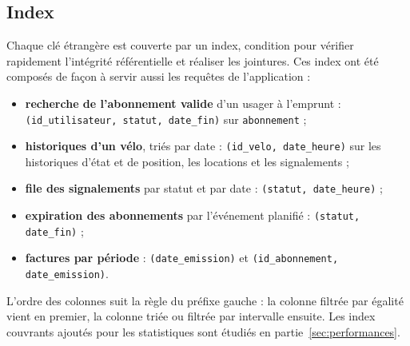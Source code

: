 \subsection{Index}

Chaque clé étrangère est couverte par un index, condition pour vérifier rapidement l'intégrité référentielle et réaliser les jointures. Ces index ont été composés de façon à servir aussi les requêtes de l'application :
\begin{itemize}
	\item \textbf{recherche de l'abonnement valide} d'un usager à l'emprunt : \texttt{(id\_utilisateur, statut, date\_fin)} sur \texttt{abonnement} ;
	\item \textbf{historiques d'un vélo}, triés par date : \texttt{(id\_velo, date\_heure)} sur les historiques d'état et de position, les locations et les signalements ;
	\item \textbf{file des signalements} par statut et par date : \texttt{(statut, date\_heure)} ;
	\item \textbf{expiration des abonnements} par l'événement planifié : \texttt{(statut, date\_fin)} ;
	\item \textbf{factures par période} : \texttt{(date\_emission)} et \texttt{(id\_abonnement, date\_emission)}.
\end{itemize}
L'ordre des colonnes suit la règle du préfixe gauche : la colonne filtrée par égalité vient en premier, la colonne triée ou filtrée par intervalle ensuite. Les index couvrants ajoutés pour les statistiques sont étudiés en partie~\ref{sec:performances}.
